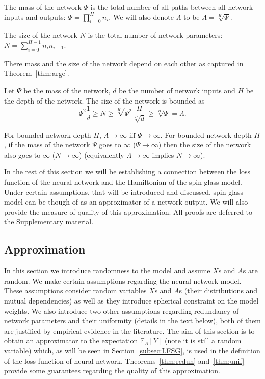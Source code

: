 \documentclass[twoside]{article}
\begin{document}
\begin{definition}
The mass of the network $\Psi$ is the total number of all paths between all network inputs and outputs: $\Psi = \prod_{i=0}^Hn_i$. We will also denote $\Lambda$ to be $\Lambda = \sqrt[H]{\Psi}$.
\end{definition}

\begin{definition}
The size of the network $N$ is the total number of network parameters: $N = \sum_{i=0}^{H-1}n_in_{i+1}$.
\end{definition}

There mass and the size of the network depend on each other as captured in Theorem~\ref{thm:arge}.
\begin{theorem}
Let $\Psi$ be the mass of the network, $d$ be the number of network inputs and $H$ be the depth of the network. The size of the network is bounded as
\[\Psi^2\frac{1}{d} \geq N \geq \sqrt[H]{\Psi^2}\frac{H}{\sqrt[H]{d}} \geq \sqrt[H]{\Psi} = \Lambda.
\]
\label{thm:arge}
\end{theorem}
\begin{corollary}
For bounded network depth $H$, $\Lambda \rightarrow \infty$ iff $\Psi \rightarrow \infty$. For bounded network depth $H$, if the mass of the network $\Psi$ goes to $\infty$ ($\Psi \rightarrow \infty$) then the size of the network also goes to $\infty$ ($N \rightarrow \infty$) (equivalently $\Lambda \rightarrow \infty$ implies $N \rightarrow \infty$). 
\end{corollary}

In the rest of this section we will be establishing a connection between the loss function of the neural network and the Hamiltonian of the spin-glass model. Under certain assumptions, that will be introduced and discussed, spin-glass model can be though of as an approximator of a network output. We will also provide the measure of quality of this approximation. All proofs are deferred to the Supplementary material.

\subsection{Approximation}

In this section we introduce randomness to the model and assume $X$s and $A$s are random. We make certain assumptions regarding the neural network model. These assumptions consider random variables $X$s and $A$s (their distributions and mutual dependencies) as well as they introduce spherical constraint on the model weights. We also introduce two other assumptions regarding redundancy of network parameters and their uniformity (details in the text below), both of them are justified by empirical evidence in the literature. The aim of this section is to obtain an approximator to the expectation $\mathbb{E}_A[Y]$ (note it is still a random variable) which, as will be seen in Section~\ref{subsec:LFSG}, is used in the definition of the loss function of neural network. Theorems~\ref{thm:redun} and~\ref{thm:unif} provide some guarantees regarding the quality of this approximation.  
\end{document}
